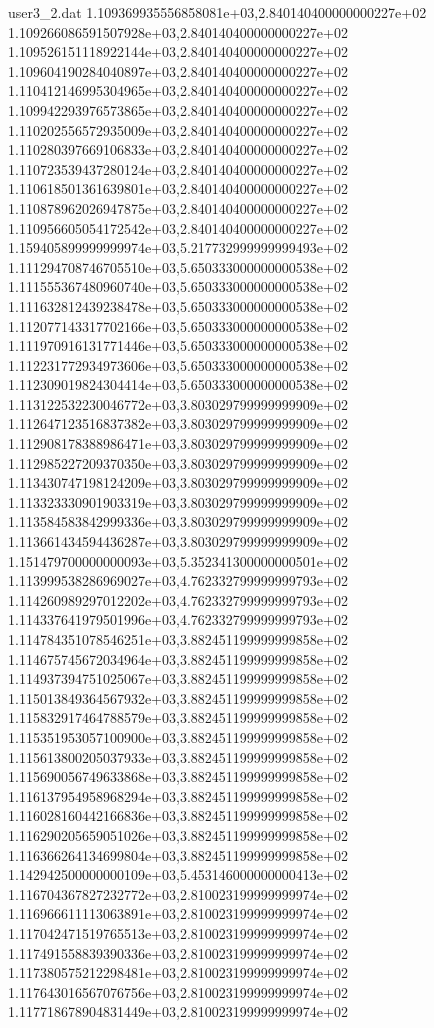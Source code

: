 \begin{filecontents}{user3_2.dat}
1.109369935556858081e+03,2.840140400000000227e+02
1.109266086591507928e+03,2.840140400000000227e+02
1.109526151118922144e+03,2.840140400000000227e+02
1.109604190284040897e+03,2.840140400000000227e+02
1.110412146995304965e+03,2.840140400000000227e+02
1.109942293976573865e+03,2.840140400000000227e+02
1.110202556572935009e+03,2.840140400000000227e+02
1.110280397669106833e+03,2.840140400000000227e+02
1.110723539437280124e+03,2.840140400000000227e+02
1.110618501361639801e+03,2.840140400000000227e+02
1.110878962026947875e+03,2.840140400000000227e+02
1.110956605054172542e+03,2.840140400000000227e+02
1.159405899999999974e+03,5.217732999999999493e+02
1.111294708746705510e+03,5.650333000000000538e+02
1.111555367480960740e+03,5.650333000000000538e+02
1.111632812439238478e+03,5.650333000000000538e+02
1.112077143317702166e+03,5.650333000000000538e+02
1.111970916131771446e+03,5.650333000000000538e+02
1.112231772934973606e+03,5.650333000000000538e+02
1.112309019824304414e+03,5.650333000000000538e+02
1.113122532230046772e+03,3.803029799999999909e+02
1.112647123516837382e+03,3.803029799999999909e+02
1.112908178388986471e+03,3.803029799999999909e+02
1.112985227209370350e+03,3.803029799999999909e+02
1.113430747198124209e+03,3.803029799999999909e+02
1.113323330901903319e+03,3.803029799999999909e+02
1.113584583842999336e+03,3.803029799999999909e+02
1.113661434594436287e+03,3.803029799999999909e+02
1.151479700000000093e+03,5.352341300000000501e+02
1.113999538286969027e+03,4.762332799999999793e+02
1.114260989297012202e+03,4.762332799999999793e+02
1.114337641979501996e+03,4.762332799999999793e+02
1.114784351078546251e+03,3.882451199999999858e+02
1.114675745672034964e+03,3.882451199999999858e+02
1.114937394751025067e+03,3.882451199999999858e+02
1.115013849364567932e+03,3.882451199999999858e+02
1.115832917464788579e+03,3.882451199999999858e+02
1.115351953057100900e+03,3.882451199999999858e+02
1.115613800205037933e+03,3.882451199999999858e+02
1.115690056749633868e+03,3.882451199999999858e+02
1.116137954958968294e+03,3.882451199999999858e+02
1.116028160442166836e+03,3.882451199999999858e+02
1.116290205659051026e+03,3.882451199999999858e+02
1.116366264134699804e+03,3.882451199999999858e+02
1.142942500000000109e+03,5.453146000000000413e+02
1.116704367827232772e+03,2.810023199999999974e+02
1.116966611113063891e+03,2.810023199999999974e+02
1.117042471519765513e+03,2.810023199999999974e+02
1.117491558839390336e+03,2.810023199999999974e+02
1.117380575212298481e+03,2.810023199999999974e+02
1.117643016567076756e+03,2.810023199999999974e+02
1.117718678904831449e+03,2.810023199999999974e+02

\end{filecontents}
